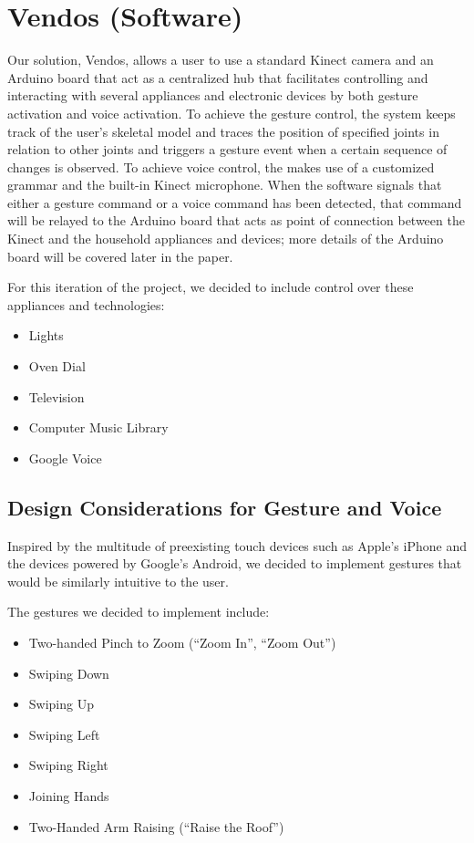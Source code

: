 \documentclass{chi-ext}
\begin{document}
\section{Vendos (Software)}

Our solution, Vendos, allows a user to use a standard Kinect camera and an Arduino board that act as a centralized hub that facilitates controlling and interacting with several appliances and electronic devices by both gesture activation and voice activation.
To achieve the gesture control, the system keeps track of the user's skeletal model and traces the position of specified joints in relation to other joints and triggers a gesture event when a certain sequence of changes is observed.
To achieve voice control, the makes use of a customized grammar and the built-in Kinect microphone.
When the software signals that either a gesture command or a voice command has been detected, that command will be relayed to the Arduino board that acts as point of connection between the Kinect and the household appliances and devices;
more details of the Arduino board will be covered later in the paper.
 
For this iteration of the project, we decided to include control over these appliances and technologies:
\begin{itemize}\compresslist
\item 	
Lights
\item
Oven Dial
\item
Television
\item
Computer Music Library
\item
Google Voice
\end{itemize}
 
\subsection{Design Considerations for Gesture and Voice}
 
Inspired by the multitude of preexisting touch devices such as Apple's iPhone and the devices powered by Google's Android, we decided to implement gestures that would be similarly intuitive to the user.
 
The gestures we decided to implement include:
\begin{itemize}\compresslist
\item
Two-handed Pinch to Zoom (``Zoom In'', ``Zoom Out'')
\item
Swiping Down
\item
Swiping Up
\item
Swiping Left
\item
Swiping Right
\item
Joining Hands
\item
Two-Handed Arm Raising (``Raise the Roof'')
\end{itemize}
\end{document}

